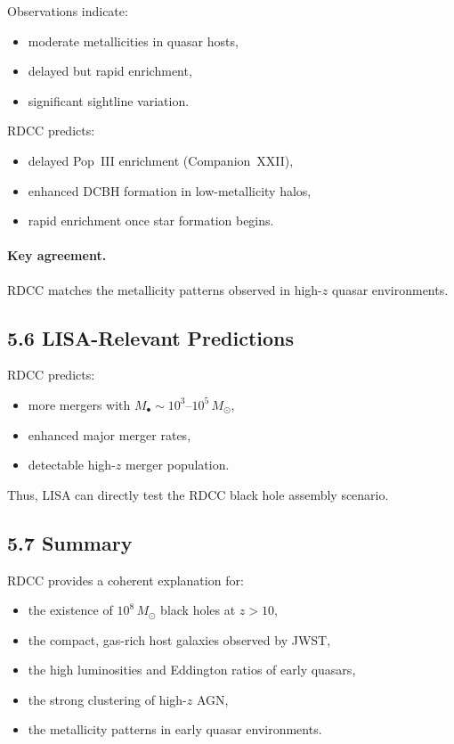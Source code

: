 \documentclass[11pt,a4paper]{article}
\begin{document}
Observations indicate:

\begin{itemize}
    \item moderate metallicities in quasar hosts,
    \item delayed but rapid enrichment,
    \item significant sightline variation.
\end{itemize}

RDCC predicts:

\begin{itemize}
    \item delayed Pop~III enrichment (Companion~XXII),
    \item enhanced DCBH formation in low-metallicity halos,
    \item rapid enrichment once star formation begins.
\end{itemize}

\paragraph{Key agreement.}
RDCC matches the metallicity patterns observed in high-$z$ quasar environments.

\subsection*{5.6 LISA-Relevant Predictions}

RDCC predicts:

\begin{itemize}
    \item more mergers with $M_{\bullet} \sim 10^{3}$–$10^{5}\,M_{\odot}$,
    \item enhanced major merger rates,
    \item detectable high-$z$ merger population.
\end{itemize}

Thus, LISA can directly test the RDCC black hole assembly scenario.

\subsection*{5.7 Summary}

RDCC provides a coherent explanation for:

\begin{itemize}
    \item the existence of $10^{8}\,M_{\odot}$ black holes at $z > 10$,
    \item the compact, gas-rich host galaxies observed by JWST,
    \item the high luminosities and Eddington ratios of early quasars,
    \item the strong clustering of high-$z$ AGN,
    \item the metallicity patterns in early quasar environments.
\end{itemize}
\end{document}
